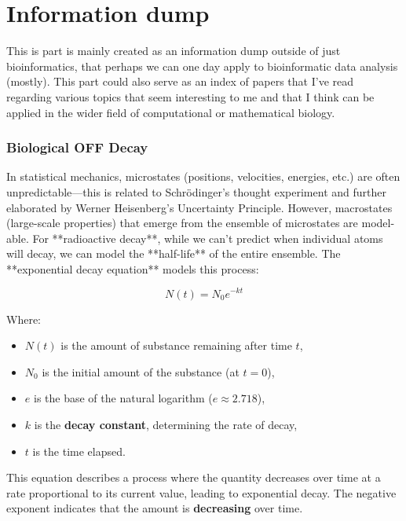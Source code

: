 \documentclass[11pt]{report}
\begin{document}
{\begin{tcolorbox}[label=box:Benchmarking, colback=gray!10!white, coltitle=white, colframe=gray!80!black, title=Benchmarking, breakable]
	
	
\end{tcolorbox}

\setcounter{section}{1}
\setcounter{subsection}{0}


\newpage

\part{Information dump}
This is part is mainly created as an information dump outside of just bioinformatics, that perhaps we can one day apply to bioinformatic data analysis (mostly). This part could also serve as an index of papers that I've read regarding various topics that seem interesting to me and that I think can be applied in the wider field of computational or mathematical biology. 



\section{Biological OFF Decay}\label{sec:biological-off-decay}
In statistical mechanics, microstates (positions, velocities, energies, etc.) are often unpredictable—this is related to Schrödinger's thought experiment and further elaborated by Werner Heisenberg’s Uncertainty Principle. However, macrostates (large-scale properties) that emerge from the ensemble of microstates are model-able.
	For **radioactive decay**, while we can’t predict when individual atoms will decay, we can model the **half-life** of the entire ensemble. The **exponential decay equation** models this process:
	
	\[
	N(t) = N_0 e^{-kt}
	\]
	
	Where:
	\begin{itemize}
		\item \( N(t) \) is the amount of substance remaining after time \( t \),
		\item \( N_0 \) is the initial amount of the substance (at \( t = 0 \)),
		\item \( e \) is the base of the natural logarithm (\( e \approx 2.718 \)),
		\item \( k \) is the \textbf{decay constant}, determining the rate of decay,
		\item \( t \) is the time elapsed.
	\end{itemize}
	
	This equation describes a process where the quantity decreases over time at a rate proportional to its current value, leading to exponential decay. The negative exponent indicates that the amount is \textbf{decreasing} over time.
	
}
\end{document}
